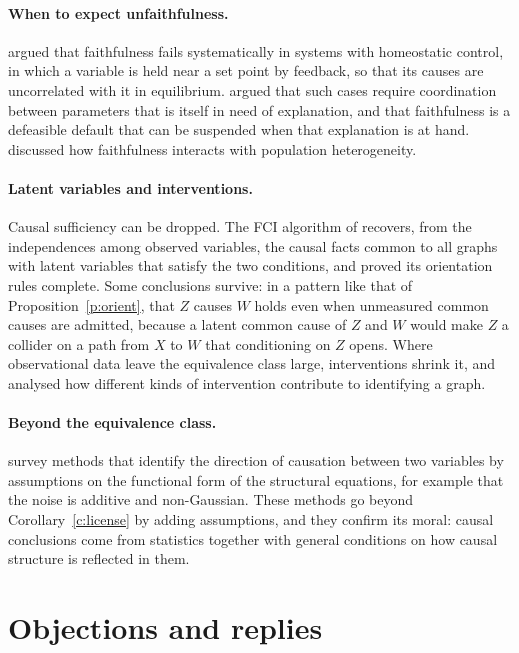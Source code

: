 \documentclass{situationist-preprint}
\begin{document}
\paragraph{When to expect unfaithfulness.} \citet{Andersen2013} argued that faithfulness fails systematically in systems with homeostatic control, in which a variable is held near a set point by feedback, so that its causes are uncorrelated with it in equilibrium. \citet{Weinberger2018} argued that such cases require coordination between parameters that is itself in need of explanation, and that faithfulness is a defeasible default that can be suspended when that explanation is at hand. \citet{Steel2006} discussed how faithfulness interacts with population heterogeneity.

\paragraph{Latent variables and interventions.} Causal sufficiency can be dropped. The FCI algorithm of \citet{SpirtesMeekRichardson1995} recovers, from the independences among observed variables, the causal facts common to all graphs with latent variables that satisfy the two conditions, and \citet{Zhang2008} proved its orientation rules complete. Some conclusions survive: in a pattern like that of Proposition~\ref{p:orient}, that $Z$ causes $W$ holds even when unmeasured common causes are admitted, because a latent common cause of $Z$ and $W$ would make $Z$ a collider on a path from $X$ to $W$ that conditioning on $Z$ opens. Where observational data leave the equivalence class large, interventions shrink it, and \citet{Eberhardt2007} analysed how different kinds of intervention contribute to identifying a graph.

\paragraph{Beyond the equivalence class.} \citet{Peters2017} survey methods that identify the direction of causation between two variables by assumptions on the functional form of the structural equations, for example that the noise is additive and non-Gaussian. These methods go beyond Corollary~\ref{c:license} by adding assumptions, and they confirm its moral: causal conclusions come from statistics together with general conditions on how causal structure is reflected in them.

\section{Objections and replies}\label{s:objections}
\end{document}
